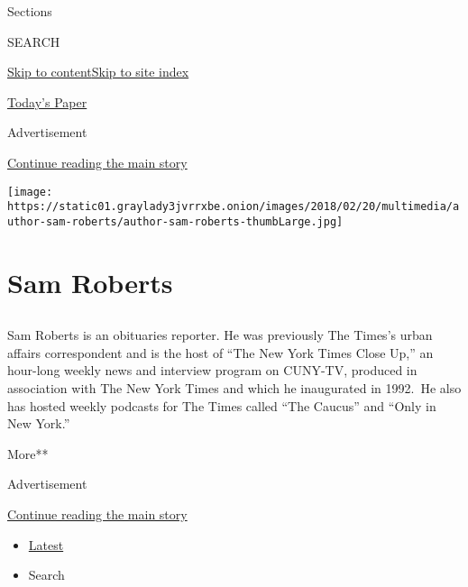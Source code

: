 Sections

SEARCH

\protect\hyperlink{site-content}{Skip to
content}\protect\hyperlink{site-index}{Skip to site index}

\href{https://myaccount.nytimes3xbfgragh.onion/auth/login?response_type=cookie\&client_id=vi}{}

\href{https://www.nytimes3xbfgragh.onion/section/todayspaper}{Today's
Paper}

Advertisement

\protect\hyperlink{after-top}{Continue reading the main story}

\texttt{[image: https://static01.graylady3jvrrxbe.onion/images/2018/02/20/multimedia/author-sam-roberts/author-sam-roberts-thumbLarge.jpg]}

\hypertarget{sam-roberts}{%
\section{Sam Roberts}\label{sam-roberts}}

\subsection{}

Sam Roberts is an obituaries reporter. He was previously The Times's
urban affairs correspondent and is the host of ``The New York Times
Close Up,'' an hour-long weekly news and interview program on CUNY-TV,
produced in association with The New York Times and which he inaugurated
in 1992.~He also has hosted weekly podcasts for The Times called ``The
Caucus'' and ``Only in New York.''

More**

Advertisement

\protect\hyperlink{after-mid1}{Continue reading the main story}

\begin{itemize}
\tightlist
\item
  \protect\hyperlink{stream-panel}{Latest}
\item
  Search
\end{itemize}

